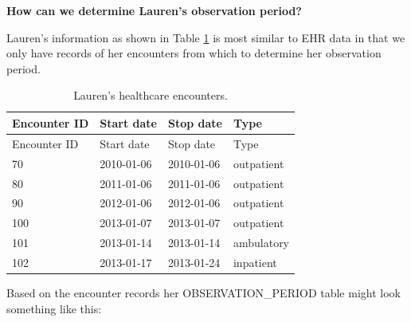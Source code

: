 \documentclass[11pt]{book}
\begin{document}
\textbf{How can we determine Lauren's observation period?}

Lauren's information as shown in Table \ref{tab:encounters} is most
similar to EHR data in that we only have records of her encounters from
which to determine her observation period.

\begin{longtable}[]{@{}llll@{}}
\caption{\label{tab:encounters} Lauren's healthcare
encounters.}\tabularnewline
\toprule
Encounter ID & Start date & Stop date & Type\tabularnewline
\midrule
\endfirsthead
\toprule
Encounter ID & Start date & Stop date & Type\tabularnewline
\midrule
\endhead
70 & 2010-01-06 & 2010-01-06 & outpatient\tabularnewline
80 & 2011-01-06 & 2011-01-06 & outpatient\tabularnewline
90 & 2012-01-06 & 2012-01-06 & outpatient\tabularnewline
100 & 2013-01-07 & 2013-01-07 & outpatient\tabularnewline
101 & 2013-01-14 & 2013-01-14 & ambulatory\tabularnewline
102 & 2013-01-17 & 2013-01-24 & inpatient\tabularnewline
\bottomrule
\end{longtable}

Based on the encounter records her OBSERVATION\_PERIOD table might look
something like this:
\end{document}
